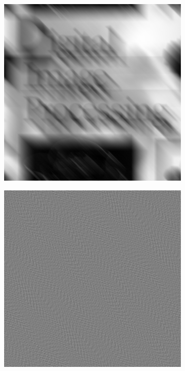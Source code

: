 \begin{figure}[h]
\begin{subfigure}[b]{0.3\linewidth}
		\caption{}
		\label{fig:5_wiener_65}
	\end{subfigure}
	\begin{subfigure}[b]{0.3\linewidth}
		\includegraphics[width=\linewidth]{myfigure/p5/5_blur_gaussian_006.png}
		\caption{}
		\label{fig:5_gaussian_006}
	\end{subfigure}
  	\begin{subfigure}[b]{0.3\linewidth}
		\includegraphics[width=\linewidth]{myfigure/p5/5_inverse_006.png}

\end{subfigure}
\end{figure}
